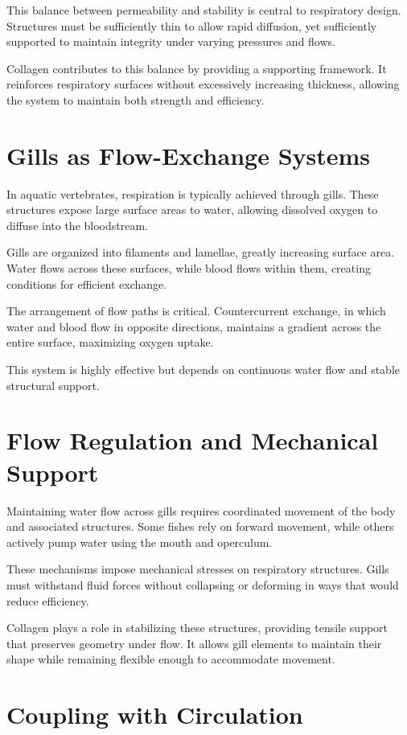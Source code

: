 \documentclass[11pt,oneside]{book}
\begin{document}
This balance between permeability and stability is central to respiratory design. Structures must be sufficiently thin to allow rapid diffusion, yet sufficiently supported to maintain integrity under varying pressures and flows.

Collagen contributes to this balance by providing a supporting framework. It reinforces respiratory surfaces without excessively increasing thickness, allowing the system to maintain both strength and efficiency.

\section{Gills as Flow-Exchange Systems}

In aquatic vertebrates, respiration is typically achieved through gills. These structures expose large surface areas to water, allowing dissolved oxygen to diffuse into the bloodstream.

Gills are organized into filaments and lamellae, greatly increasing surface area. Water flows across these surfaces, while blood flows within them, creating conditions for efficient exchange.

The arrangement of flow paths is critical. Countercurrent exchange, in which water and blood flow in opposite directions, maintains a gradient across the entire surface, maximizing oxygen uptake.

This system is highly effective but depends on continuous water flow and stable structural support.

\section{Flow Regulation and Mechanical Support}

Maintaining water flow across gills requires coordinated movement of the body and associated structures. Some fishes rely on forward movement, while others actively pump water using the mouth and operculum.

These mechanisms impose mechanical stresses on respiratory structures. Gills must withstand fluid forces without collapsing or deforming in ways that would reduce efficiency.

Collagen plays a role in stabilizing these structures, providing tensile support that preserves geometry under flow. It allows gill elements to maintain their shape while remaining flexible enough to accommodate movement.

\section{Coupling with Circulation}
\end{document}
